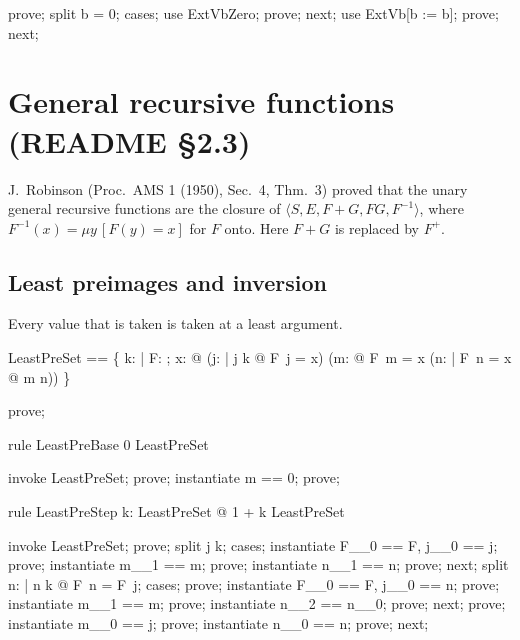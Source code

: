 \documentclass{article}
\begin{document}
\begin{zproof}
prove;
split b = 0;
cases;
use ExtVbZero;
prove;
next;
use ExtVb[b := b];
prove;
next;
\end{zproof}

\section{General recursive functions (README \S 2.3)}

J.~Robinson (Proc.\ AMS 1 (1950), Sec.~4, Thm.~3) proved that the unary general recursive
functions are the closure of $\langle S, E, F + G, FG, F^{-1}\rangle$, where
$F^{-1}(x) = \mu y\,[F(y) = x]$ for $F$ onto.  Here $F + G$ is replaced by $F^+$.

\subsection{Least preimages and inversion}

Every value that is taken is taken at a least argument.

\begin{zed}
  LeastPreSet == \{ k: \nat | \forall F: \nat \fun \nat; x: \nat @ (\forall j: \nat | j \leq k @ \lnot F~j = x) \lor (\exists m: \nat @ F~m = x \land (\forall n: \nat | F~n = x @ m \leq n)) \}
\end{zed}

\begin{zproof}
prove;
\end{zproof}

\begin{theorem}{rule LeastPreBase}
  0 \in LeastPreSet
\end{theorem}

\begin{zproof}
invoke LeastPreSet;
prove;
instantiate m == 0;
prove;
\end{zproof}

\begin{theorem}{rule LeastPreStep}
  \forall k: LeastPreSet @ 1 + k \in LeastPreSet
\end{theorem}

\begin{zproof}
invoke LeastPreSet;
prove;
split j \leq k;
cases;
instantiate F\_\_0 == F, j\_\_0 == j;
prove;
instantiate m\_\_1 == m;
prove;
instantiate n\_\_1 == n;
prove;
next;
split \exists n: \nat | n \leq k @ F~n = F~j;
cases;
prove;
instantiate F\_\_0 == F, j\_\_0 == n;
prove;
instantiate m\_\_1 == m;
prove;
instantiate n\_\_2 == n\_\_0;
prove;
next;
prove;
instantiate m\_\_0 == j;
prove;
instantiate n\_\_0 == n;
prove;
next;
\end{zproof}
\end{document}
